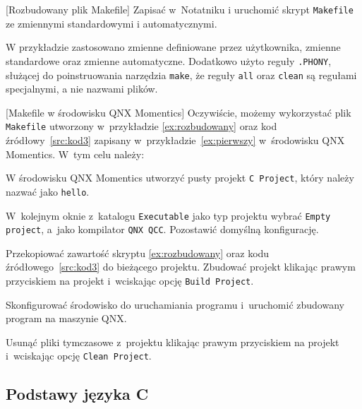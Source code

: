 \begin{example}{[Rozbudowany plik Makefile]}
Zapisać w~Notatniku i uruchomić skrypt \lstinline[style=MyBashStyle]{Makefile} ze zmiennymi standardowymi i automatycznymi.



W przykładzie zastosowano zmienne definiowane przez użytkownika, zmienne standardowe oraz zmienne automatyczne. Dodatkowo użyto reguły \lstinline[style=MyBashStyle]{.PHONY}, służącej do poinstruowania narzędzia \lstinline[style=MyBashStyle]{make}, że reguły \lstinline[style=MyBashStyle]{all} oraz \lstinline[style=MyBashStyle]{clean} są regułami specjalnymi, a nie nazwami plików.
\end{example}


\begin{example}{[Makefile w środowisku QNX Momentics]}
Oczywiście, możemy wykorzystać plik \lstinline[style=MyBashStyle]{Makefile} utworzony w~przykładzie \ref{ex:rozbudowany} oraz kod źródłowy~\ref{src:kod3} zapisany w~przykładzie~\ref{ex:pierwszy} w~środowisku QNX Momentics. W~tym celu należy:

\begin{myenumerate}
\item W środowisku QNX Momentics utworzyć pusty projekt \lstinline[style=MyBashStyle]{C Project}, który należy nazwać jako \lstinline[style=MyBashStyle]{hello}.
\item W~kolejnym oknie z~katalogu \lstinline[style=MyBashStyle]{Executable} jako typ projektu wybrać \lstinline[style=MyBashStyle]{Empty project}, a~jako kompilator \lstinline[style=MyBashStyle]{QNX QCC}. Pozostawić domyślną konfigurację. 
\item Przekopiować zawartość skryptu \ref{ex:rozbudowany} oraz kodu źródłowego~\ref{src:kod3} do bieżącego projektu. Zbudować projekt klikając prawym przyciskiem na projekt i~wciskając opcję \lstinline[style=MyBashStyle]{Build Project}.
\item Skonfigurować środowisko do uruchamiania programu i~uruchomić zbudowany program na maszynie QNX.
\item Usunąć pliki tymczasowe z~projektu klikając prawym przyciskiem na projekt i~wciskając opcję \lstinline[style=MyBashStyle]{Clean Project}.
\end{myenumerate}
\end{example}

\subsection{Podstawy języka C}

